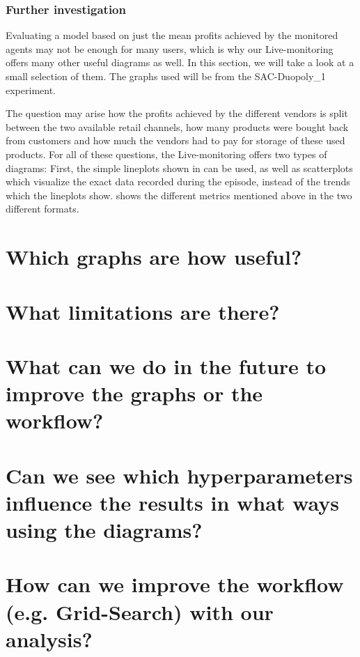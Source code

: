 \subsubsection*{Further investigation}

Evaluating a model based on just the mean profits achieved by the monitored agents may not be enough for many users, which is why our Live-monitoring offers many other useful diagrams as well. In this section, we will take a look at a small selection of them. The graphs used will be from the SAC-Duopoly\_1 experiment.

The question may arise how the profits achieved by the different vendors is split between the two available retail channels, how many products were bought back from customers and how much the vendors had to pay for storage of these used products. For all of these questions, the Live-monitoring offers two types of diagrams: First, the simple lineplots shown in  can be used, as well as scatterplots which visualize the exact data recorded during the episode, instead of the trends which the lineplots show.  shows the different metrics mentioned above in the two different formats.

\section*{Which graphs are how useful?}
\section*{What limitations are there?}
\section*{What can we do in the future to improve the graphs or the workflow?}
\section*{Can we see which hyperparameters influence the results in what ways using the diagrams?}
\section*{How can we improve the workflow (e.g. Grid-Search) with our analysis?}

